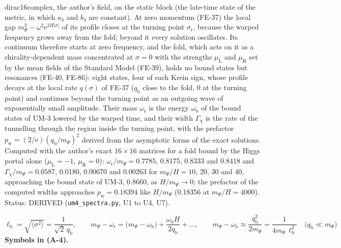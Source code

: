 \documentclass[
  10pt,
]{article}
\begin{document}
dirac16complex, the author's field, on the static block (the late-time
state of the metric, in which \(a_4\) and \(b_4\) are constant). At zero
momentum (FE-37) the local gap
\(m_\Psi^2 - \omega^2\mathrm{e}^{2H\lvert\sigma\rvert}\) of its profile
closes at the turning point \(\sigma_{\mathrm{t}}\), because the warped
frequency grows away from the fold; beyond it every solution oscillates.
Its continuum therefore starts at zero frequency, and the fold, which
acts on it as a chirality-dependent mass concentrated at \(\sigma = 0\)
with the strengths \(\mu_{\mathrm{L}}\) and \(\mu_{\mathrm{R}}\) set by
the mean fields of the Standard Model (FE-39), holds no bound states but
resonances (FE-40, FE-86): eight states, four of each Krein sign, whose
profile decays at the local rate \(q(\sigma)\) of FE-37
(\(q_{\mathrm{b}}\) close to the fold, 0 at the turning point) and
continues beyond the turning point as an outgoing wave of exponentially
small amplitude. Their mass \(\omega_{\mathrm{r}}\) is the energy
\(\omega_{\mathrm{b}}\) of the bound states of UM-3 lowered by the
warped time, and their width \(\Gamma_\chi\) is the rate of the
tunnelling through the region inside the turning point, with the
prefactor \(p_{\mathrm{w}} = (2/\mathrm{e})(q_{\mathrm{b}}/m_\Psi)^2\)
derived from the asymptotic forms of the exact solutions. Computed with
the author's exact \(16 \times 16\) matrices for a fold bound by the
Higgs portal alone (\(\mu_{\mathrm{L}} = -1\),
\(\mu_{\mathrm{R}} = 0\)): \(\omega_{\mathrm{r}}/m_\Psi = 0.7785\),
0.8175, 0.8333 and 0.8418 and \(\Gamma_\chi/m_\Psi = 0.0587\), 0.0180,
0.00670 and 0.00263 for \(m_\Psi/H = 10\), 20, 30 and 40, approaching
the bound state of UM-3, 0.8660, as \(H/m_\Psi \to 0\); the prefactor of
the computed widths approaches \(p_{\mathrm{w}} = 0.18394\) like
\(H/m_\Psi\) (0.18356 at \(m_\Psi/H = 4000\)). Status: DERIVED
(\texttt{um4\_spectra.py}, U1 to U4, U7).

\[
\ell_{\mathrm{b}} = \sqrt{\big\langle\sigma^2\big\rangle} = \frac{1}{\sqrt2\,q_{\mathrm{b}}},\qquad
m_\Psi - \omega_{\mathrm{r}} = \big(m_\Psi - \omega_{\mathrm{b}}\big) + \frac{\omega_{\mathrm{b}}H}{2q_{\mathrm{b}}} + \dots,\qquad
m_\Psi - \omega_{\mathrm{b}} \approx \frac{q_{\mathrm{b}}^2}{2m_\Psi} = \frac{1}{4m_\Psi\,\ell_{\mathrm{b}}^2}\quad\big(q_{\mathrm{b}} \ll m_\Psi\big) \tag{A-4}
\] \textbf{Symbols in (A-4).}
\end{document}
